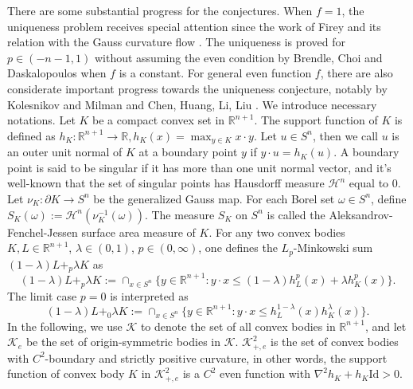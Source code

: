 \documentclass[reqno]{amsart}
\theoremstyle{remark}
\def\cH{{\mathcal H}}
\def\cK{{\mathcal K}}
\theoremstyle{plain}
\begin{document}
There are some substantial progress for the conjectures. When $f=1$, the uniqueness problem receives special attention since the work of Firey \cite{Firey66} and its relation with the Gauss curvature flow \cite{Chou85, Andrews99, AGN}. The uniqueness is proved for $p\in (-n-1, 1)$ without assuming the even condition by Brendle, Choi and Daskalopoulos \cite{BCD} when $f$ is a constant. For general even function $f$, there are also considerate important progress towards the uniqueness conjecture,  notably by Kolesnikov and Milman \cite{KM01} and Chen, Huang, Li, Liu \cite{CHLL}.
We introduce necessary notations. Let $K$ be a compact convex set in $\mathbb{R}^{n+1}$. The support function of $K$ is defined as $h_K:\mathbb{R}^{n+1}\rightarrow \mathbb{R}, h_K(x)=\max_{y\in K}x\cdot y$. Let $u\in S^n$, then we call $u$ is an outer unit normal of $K$ at a boundary point $y$ if $y\cdot u=h_K(u)$. A boundary point is said to be singular if it has more than one unit normal vector, and it's well-known that the set of singular points has Hausdorff measure $\cH^{n}$ equal to 0. Let $\nu_K:\partial K\rightarrow S^n$ be the generalized Gauss map. For each Borel set $\omega\in S^n$, define $S_K(\omega):=\cH^n(\nu_K^{-1}(\omega))$. The measure $S_K$ on $S^n$ is called the Aleksandrov-Fenchel-Jessen surface area measure of $K$. For any two convex bodies $K,L\in \mathbb{R}^{n+1}$, $\lambda\in (0,1)$, $p\in (0,\infty)$, one defines the $L_p$-Minkowski sum $(1-\lambda)L+_p\lambda K$ as \begin{equation}
  (1-\lambda)L+_p\lambda K:=\cap_{x\in S^n}\{y\in\mathbb{R}^{n+1}:y\cdot x\leq (1-\lambda)h_L^p(x)+\lambda h_K^p(x)\}.  
\end{equation}  
The limit case $p=0$ is interpreted as \begin{equation}
     (1-\lambda)L+_0\lambda K:=\cap_{x\in S^n}\{y\in\mathbb{R}^{n+1}:y\cdot x\leq h_L^{1-\lambda}(x)h_K^{\lambda}(x)\}.  
\end{equation}
In the following, we use $\cK$ to denote the set of all convex bodies in $\mathbb{R}^{n+1}$, and let $\cK_e$ be the set of origin-symmetric bodies in $\cK$. $\cK_{+,e}^2$ is the set of convex bodies with $C^{2}$-boundary and strictly positive curvature, in other words, the support function of convex body $K$ in $\cK_{+,e}^2$ is a $C^2$ even function with $\nabla^2h_K+h_K\text{Id}>0$.
\end{document}
